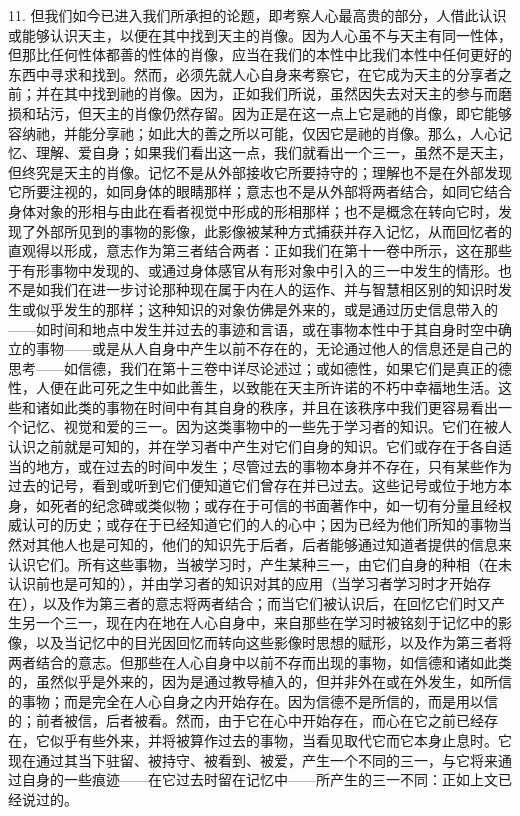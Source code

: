 11. 但我们如今已进入我们所承担的论题，即考察人心最高贵的部分，人借此认识或能够认识天主，以便在其中找到天主的肖像。因为人心虽不与天主有同一性体，但那比任何性体都善的性体的肖像，应当在我们的本性中比我们本性中任何更好的东西中寻求和找到。然而，必须先就人心自身来考察它，在它成为天主的分享者之前；并在其中找到祂的肖像。因为，正如我们所说，虽然因失去对天主的参与而磨损和玷污，但天主的肖像仍然存留。因为正是在这一点上它是祂的肖像，即它能够容纳祂，并能分享祂；如此大的善之所以可能，仅因它是祂的肖像。那么，人心记忆、理解、爱自身；如果我们看出这一点，我们就看出一个三一，虽然不是天主，但终究是天主的肖像。记忆不是从外部接收它所要持守的；理解也不是在外部发现它所要注视的，如同身体的眼睛那样；意志也不是从外部将两者结合，如同它结合身体对象的形相与由此在看者视觉中形成的形相那样；也不是概念在转向它时，发现了外部所见到的事物的影像，此影像被某种方式捕获并存入记忆，从而回忆者的直观得以形成，意志作为第三者结合两者：正如我们在第十一卷中所示，这在那些于有形事物中发现的、或通过身体感官从有形对象中引入的三一中发生的情形。也不是如我们在进一步讨论那种现在属于内在人的运作、并与智慧相区别的知识时发生或似乎发生的那样；这种知识的对象仿佛是外来的，或是通过历史信息带入的——如时间和地点中发生并过去的事迹和言语，或在事物本性中于其自身时空中确立的事物——或是从人自身中产生以前不存在的，无论通过他人的信息还是自己的思考——如信德，我们在第十三卷中详尽论述过；或如德性，如果它们是真正的德性，人便在此可死之生中如此善生，以致能在天主所许诺的不朽中幸福地生活。这些和诸如此类的事物在时间中有其自身的秩序，并且在该秩序中我们更容易看出一个记忆、视觉和爱的三一。因为这类事物中的一些先于学习者的知识。它们在被人认识之前就是可知的，并在学习者中产生对它们自身的知识。它们或存在于各自适当的地方，或在过去的时间中发生；尽管过去的事物本身并不存在，只有某些作为过去的记号，看到或听到它们便知道它们曾存在并已过去。这些记号或位于地方本身，如死者的纪念碑或类似物；或存在于可信的书面著作中，如一切有分量且经权威认可的历史；或存在于已经知道它们的人的心中；因为已经为他们所知的事物当然对其他人也是可知的，他们的知识先于后者，后者能够通过知道者提供的信息来认识它们。所有这些事物，当被学习时，产生某种三一，由它们自身的种相（在未认识前也是可知的），并由学习者的知识对其的应用（当学习者学习时才开始存在），以及作为第三者的意志将两者结合；而当它们被认识后，在回忆它们时又产生另一个三一，现在内在地在人心自身中，来自那些在学习时被铭刻于记忆中的影像，以及当记忆中的目光因回忆而转向这些影像时思想的赋形，以及作为第三者将两者结合的意志。但那些在人心自身中以前不存而出现的事物，如信德和诸如此类的，虽然似乎是外来的，因为是通过教导植入的，但并非外在或在外发生，如所信的事物；而是完全在人心自身之内开始存在。因为信德不是所信的，而是用以信的；前者被信，后者被看。然而，由于它在心中开始存在，而心在它之前已经存在，它似乎有些外来，并将被算作过去的事物，当看见取代它而它本身止息时。它现在通过其当下驻留、被持守、被看到、被爱，产生一个不同的三一，与它将来通过自身的一些痕迹——在它过去时留在记忆中——所产生的三一不同：正如上文已经说过的。\par

